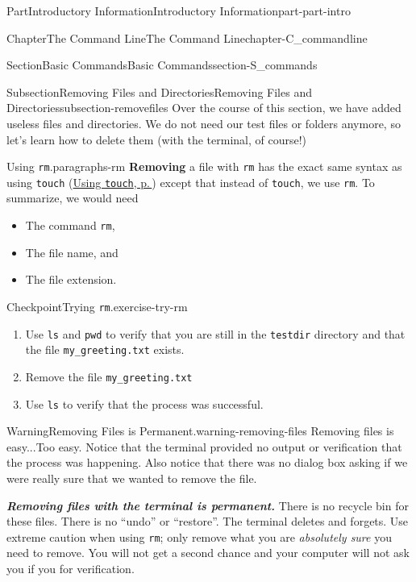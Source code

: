 \documentclass[twoside,10pt,]{book}
\newcommand{\mono}[1]{\texttt{#1}}
\newcommand{\alert}[1]{\textbf{\textit{#1}}}
\newcommand{\terminology}[1]{\textbf{#1}}
\begin{document}
\begin{partptx}{Part}{Introductory Information}{}{Introductory Information}{}{}{part-part-intro}
\begin{chapterptx}{Chapter}{The Command Line}{}{The Command Line}{}{}{chapter-C_commandline}
\begin{sectionptx}{Section}{Basic Commands}{}{Basic Commands}{}{}{section-S_commands}
\typeout{************************************************}
%
\begin{subsectionptx}{Subsection}{Removing Files and Directories}{}{Removing Files and Directories}{}{}{subsection-removefiles}
%
Over the course of this section, we have added useless files and directories. We do not need our test files or folders anymore, so let's learn how to delete them (with the terminal, of course!)%
\begin{paragraphs}{Using \mono{rm}.}{paragraphs-rm}%
\index{\mono{rm}}%
%
\index{command line!\mono{rm}}%
\terminology{Removing} a file with \mono{rm} has the exact same syntax as using \mono{touch} (\hyperlink{paragraphs-touch}{Using \mono{touch}, p.\,\pageref{paragraphs-touch}}) except that instead of \mono{touch}, we use \mono{rm}. To summarize, we would need%
\begin{itemize}[label=\textbullet]
\item{}The command \mono{rm},%
\item{}The file name, and%
\item{}The file extension.%
\end{itemize}
%
\begin{inlineexercise}{Checkpoint}{Trying \mono{rm}.}{exercise-try-rm}%
\begin{enumerate}[font=\bfseries,label=(\alph*),ref=\alph*]%
\item{}Use \mono{ls} and \mono{pwd} to verify that you are still in the \mono{testdir} directory and that the file \mono{my\_greeting.txt} exists.%
\item{}Remove the file \mono{my\_greeting.txt}%
\item{}Use \mono{ls} to verify that the process was successful.%
\end{enumerate}%
\end{inlineexercise}%
\begin{warning}{Warning}{Removing Files is Permanent.}{warning-removing-files}%
%
Removing files is easy...Too easy. Notice that the terminal provided no output or verification that the process was happening. Also notice that there was no dialog box asking if we were really sure that we wanted to remove the file.%
\par
\alert{Removing files with the terminal is permanent.} There is no recycle bin for these files. There is no ``undo'' or ``restore''. The terminal deletes and forgets. Use extreme caution when using \mono{rm}; only remove what you are \emph{absolutely sure} you need to remove. You will not get a second chance and your computer will not ask you if you for verification.%

\end{warning}
\end{paragraphs}
\end{subsectionptx}
\end{sectionptx}
\end{chapterptx}
\end{partptx}
\end{document}
